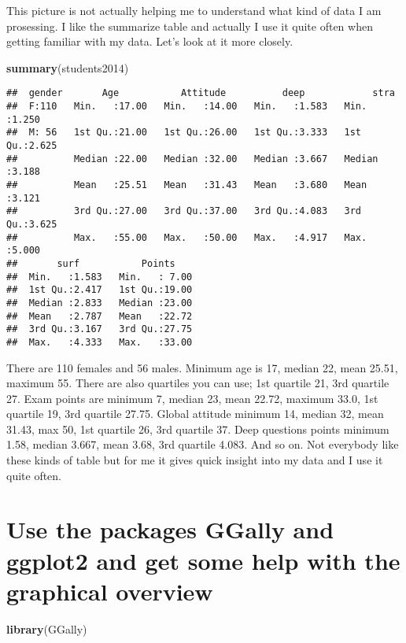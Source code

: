 \documentclass[]{article}
\newenvironment{Shaded}{\begin{snugshade}}{\end{snugshade}}
\newcommand{\KeywordTok}[1]{\textcolor[rgb]{0.13,0.29,0.53}{\textbf{#1}}}
\newcommand{\NormalTok}[1]{#1}
\begin{document}
This picture is not actually helping me to understand what kind of data
I am prosessing. I like the summarize table and actually I use it quite
often when getting familiar with my data. Let's look at it more closely.

\begin{Shaded}
\begin{Highlighting}[]
\KeywordTok{summary}\NormalTok{(students2014)}
\end{Highlighting}
\end{Shaded}

\begin{verbatim}
##  gender       Age           Attitude          deep            stra      
##  F:110   Min.   :17.00   Min.   :14.00   Min.   :1.583   Min.   :1.250  
##  M: 56   1st Qu.:21.00   1st Qu.:26.00   1st Qu.:3.333   1st Qu.:2.625  
##          Median :22.00   Median :32.00   Median :3.667   Median :3.188  
##          Mean   :25.51   Mean   :31.43   Mean   :3.680   Mean   :3.121  
##          3rd Qu.:27.00   3rd Qu.:37.00   3rd Qu.:4.083   3rd Qu.:3.625  
##          Max.   :55.00   Max.   :50.00   Max.   :4.917   Max.   :5.000  
##       surf           Points     
##  Min.   :1.583   Min.   : 7.00  
##  1st Qu.:2.417   1st Qu.:19.00  
##  Median :2.833   Median :23.00  
##  Mean   :2.787   Mean   :22.72  
##  3rd Qu.:3.167   3rd Qu.:27.75  
##  Max.   :4.333   Max.   :33.00
\end{verbatim}

There are 110 females and 56 males. Minimum age is 17, median 22, mean
25.51, maximum 55. There are also quartiles you can use; 1st quartile
21, 3rd quartile 27. Exam points are minimum 7, median 23, mean 22.72,
maximum 33.0, 1st quartile 19, 3rd quartile 27.75. Global attitude
minimum 14, median 32, mean 31.43, max 50, 1st quartile 26, 3rd quartile
37. Deep questions points minimum 1.58, median 3.667, mean 3.68, 3rd
quartile 4.083. And so on. Not everybody like these kinds of table but
for me it gives quick insight into my data and I use it quite often.

\hypertarget{use-the-packages-ggally-and-ggplot2-and-get-some-help-with-the-graphical-overview}{%
\section{Use the packages GGally and ggplot2 and get some help with the
graphical
overview}\label{use-the-packages-ggally-and-ggplot2-and-get-some-help-with-the-graphical-overview}}

\begin{Shaded}
\begin{Highlighting}[]
\KeywordTok{library}\NormalTok{(GGally)}
\end{Highlighting}
\end{Shaded}
\end{document}
